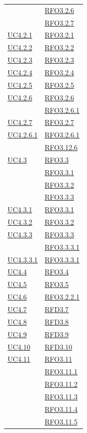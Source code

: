 \begin{longtable}{|>{\centering}m{5cm}|m{5cm}<{\centering}|}
& \hyperlink{RFO3.2.6}{RFO3.2.6}\\
& \hyperlink{RFO3.2.7}{RFO3.2.7}\\ \hline
\hyperref[UC4.2.1]{UC4.2.1} & \hyperlink{RFO3.2.1}{RFO3.2.1}\\ \hline
\hyperref[UC4.2.2]{UC4.2.2} & \hyperlink{RFO3.2.2}{RFO3.2.2}\\ \hline
\hyperref[UC4.2.3]{UC4.2.3} & \hyperlink{RFO3.2.3}{RFO3.2.3}\\ \hline
\hyperref[UC4.2.4]{UC4.2.4} & \hyperlink{RFO3.2.4}{RFO3.2.4}\\ \hline
\hyperref[UC4.2.5]{UC4.2.5} & \hyperlink{RFO3.2.5}{RFO3.2.5}\\ \hline
\hyperref[UC4.2.6]{UC4.2.6} & \hyperlink{RFO3.2.6}{RFO3.2.6}\\
& \hyperlink{RFO3.2.6.1}{RFO3.2.6.1}\\ \hline
\hyperref[UC4.2.7]{UC4.2.7} & \hyperlink{RFO3.2.7}{RFO3.2.7}\\ \hline
\hyperref[UC4.2.6.1]{UC4.2.6.1} & \hyperlink{RFO3.2.6.1}{RFO3.2.6.1}\\ & \hyperlink{RFO3.12.6}{RFO3.12.6}\\ \hline
\hyperref[UC4.3]{UC4.3} & \hyperlink{RFO3.3}{RFO3.3}\\
& \hyperlink{RFO3.3.1}{RFO3.3.1}\\
& \hyperlink{RFO3.3.2}{RFO3.3.2}\\
& \hyperlink{RFO3.3.3}{RFO3.3.3}\\ \hline
\hyperref[UC4.3.1]{UC4.3.1} & \hyperlink{RFO3.3.1}{RFO3.3.1}\\ \hline
\hyperref[UC4.3.2]{UC4.3.2} & \hyperlink{RFO3.3.2}{RFO3.3.2}\\ \hline
\hyperref[UC4.3.3]{UC4.3.3} & \hyperlink{RFO3.3.3}{RFO3.3.3}\\
& \hyperlink{RFO3.3.3.1}{RFO3.3.3.1}\\ \hline
\hyperref[UC4.3.3.1]{UC4.3.3.1} & \hyperlink{RFO3.3.3.1}{RFO3.3.3.1}\\ \hline
\hyperref[UC4.4]{UC4.4} & \hyperlink{RFO3.4}{RFO3.4}\\ \hline
\hyperref[UC4.5]{UC4.5} & \hyperlink{RFO3.5}{RFO3.5}\\ \hline
\hyperref[UC4.6]{UC4.6} & \hyperlink{RFO3.2.2.1}{RFO3.2.2.1}\\ \hline
\hyperref[UC4.7]{UC4.7} & \hyperlink{RFD3.7}{RFD3.7}\\ \hline
\hyperref[UC4.8]{UC4.8} & \hyperlink{RFD3.8}{RFD3.8}\\ \hline
\hyperref[UC4.9]{UC4.9} & \hyperlink{RFD3.9}{RFD3.9}\\ \hline
\hyperref[UC4.10]{UC4.10} & \hyperlink{RFD3.10}{RFD3.10}\\ \hline
\hyperref[UC4.11]{UC4.11} & \hyperlink{RFO3.11}{RFO3.11}\\
& \hyperlink{RFO3.11.1}{RFO3.11.1}\\
& \hyperlink{RFO3.11.2}{RFO3.11.2}\\
& \hyperlink{RFO3.11.3}{RFO3.11.3}\\
& \hyperlink{RFO3.11.4}{RFO3.11.4}\\
& \hyperlink{RFO3.11.5}{RFO3.11.5}\\\hline


\end{longtable}
